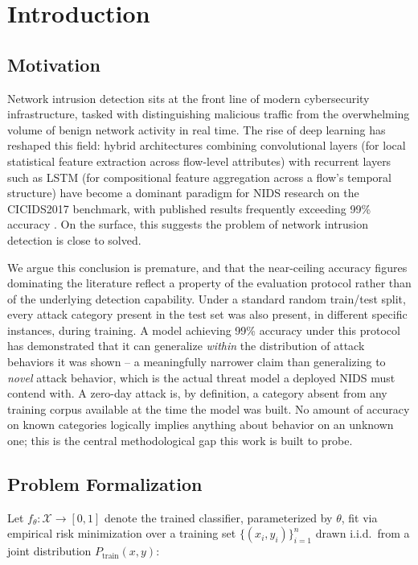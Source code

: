 \documentclass[11pt]{article}
\begin{document}
\tableofcontents
\newpage

\section{Introduction}

\subsection{Motivation}

Network intrusion detection sits at the front line of modern cybersecurity infrastructure, tasked
with distinguishing malicious traffic from the overwhelming volume of benign network activity in
real time. The rise of deep learning has reshaped this field: hybrid architectures combining
convolutional layers (for local statistical feature extraction across flow-level attributes) with
recurrent layers such as LSTM (for compositional feature aggregation across a flow's temporal
structure) have become a dominant paradigm for NIDS research on the CICIDS2017 benchmark, with
published results frequently exceeding 99\% accuracy \cite{afraji2025,kumar2023}. On the surface,
this suggests the problem of network intrusion detection is close to solved.

We argue this conclusion is premature, and that the near-ceiling accuracy figures dominating the
literature reflect a property of the evaluation protocol rather than of the underlying detection
capability. Under a standard random train/test split, every attack category present in the test
set was also present, in different specific instances, during training. A model achieving 99\%
accuracy under this protocol has demonstrated that it can generalize \emph{within} the distribution
of attack behaviors it was shown -- a meaningfully narrower claim than generalizing to \emph{novel}
attack behavior, which is the actual threat model a deployed NIDS must contend with. A zero-day
attack is, by definition, a category absent from any training corpus available at the time the
model was built. No amount of accuracy on known categories logically implies anything about
behavior on an unknown one; this is the central methodological gap this work is built to probe.

\subsection{Problem Formalization}
\label{sec:formalization}

Let $f_\theta : \mathcal{X} \to [0,1]$ denote the trained classifier, parameterized by $\theta$,
fit via empirical risk minimization over a training set $\{(x_i, y_i)\}_{i=1}^{n}$ drawn i.i.d.\
from a joint distribution $P_{\text{train}}(x, y)$:
\end{document}
